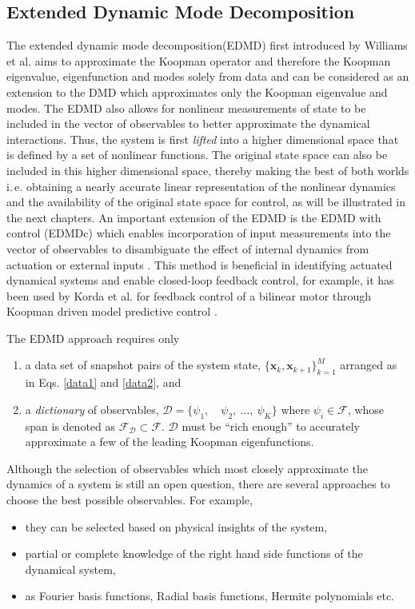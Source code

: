 \subsection{Extended Dynamic Mode Decomposition}
\label{sec:EDMD}
The extended dynamic mode decomposition(EDMD) first introduced by Williams et al. \cite{WILLIAMS2016704} aims to approximate the Koopman operator and therefore the Koopman eigenvalue, eigenfunction and modes solely from data and can be considered as an extension to the DMD which approximates only the Koopman eigenvalue and modes. The EDMD also allows for nonlinear measurements of state to be included in the vector of observables to better approximate the dynamical interactions. Thus, the system is first \textit{lifted} into a higher dimensional space that is defined by a set of nonlinear functions. The original state space can also be included in this higher dimensional space, thereby making the best of both worlds i.\,e. obtaining a nearly accurate linear representation of the nonlinear dynamics and the availability of the original state space for control, as will be illustrated in the next chapters. An important extension of the EDMD is the EDMD with control (EDMDc) which enables incorporation of input measurements into the vector of observables to disambiguate the effect of internal dynamics from actuation or external inputs \cite{DMDC}. This method is beneficial in identifying actuated dynamical systems and enable closed-loop feedback control, for example, it has been used by Korda et al. for feedback control of a bilinear motor through Koopman driven model predictive control \cite{MPC_Korda}.
\par
The EDMD approach requires only
\begin{enumerate}
    \item a data set of snapshot pairs of the system state, $\{\mathbf{x}_k,\mathbf{x}_{k+1}\}_{k=1}^M$ arranged as in Eqs. \ref{data1} and \ref{data2}, and
     \item a \textit{dictionary} of observables, $\mathcal{D} = \{\psi_1, \quad \psi_2, ~ \dots,~ \psi_K\}$ where $\psi_i \in \mathcal{F}$, whose span is denoted as $\mathcal{F_D} \subset \mathcal{F}$. $\mathcal{D}$ must be ``rich enough'' to accurately approximate a few of the leading Koopman eigenfunctions.
\end{enumerate}
Although the selection of observables which most closely approximate the dynamics of a system is still an open question, there are several approaches to choose the best possible observables. For example,
\begin{itemize}
    \item they can be selected based on physical insights of the system,
    \item partial or complete knowledge of the right hand side functions of the dynamical system,
    \item as Fourier basis functions, Radial basis functions, Hermite polynomials etc.
\end{itemize}

